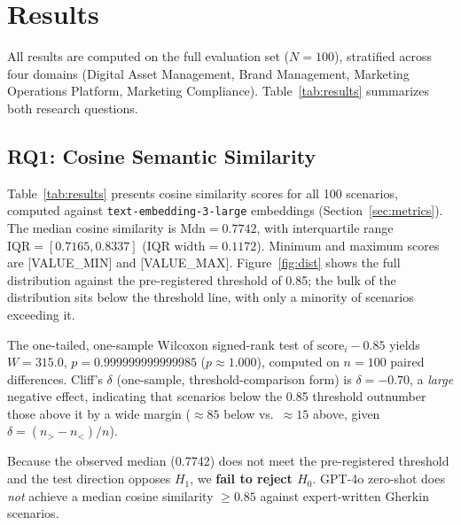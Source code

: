 \section{Results}
\label{sec:results}

All results are computed on the full evaluation set ($N{=}100$), stratified across four domains (Digital Asset Management, Brand Management, Marketing Operations Platform, Marketing Compliance).
Table~\ref{tab:results} summarizes both research questions.

\subsection{RQ1: Cosine Semantic Similarity}
\label{sec:rq1-results}

Table~\ref{tab:results} presents cosine similarity scores for all 100 scenarios, computed against \texttt{text-embedding-3-large} embeddings (Section~\ref{sec:metrics}).
The median cosine similarity is $\text{Mdn} = 0.7742$, with interquartile range $\text{IQR} = [0.7165, 0.8337]$ ($\text{IQR width} = 0.1172$).
%
%
Minimum and maximum scores are [VALUE\_MIN] and [VALUE\_MAX].
Figure~\ref{fig:dist} shows the full distribution against the pre-registered threshold of 0.85; the bulk of the distribution sits below the threshold line, with only a minority of scenarios exceeding it.

The one-tailed, one-sample Wilcoxon signed-rank test of $\text{score}_i - 0.85$ yields $W = 315.0$, $p = 0.999999999999985$ ($p \approx 1.000$), computed on $n=100$ paired differences.
Cliff's $\delta$ (one-sample, threshold-comparison form) is $\delta = -0.70$, a \emph{large} negative effect, indicating that scenarios below the 0.85 threshold outnumber those above it by a wide margin ($\approx 85$ below vs.\ $\approx 15$ above, given $\delta = (n_{>} - n_{<})/n$).

Because the observed median (0.7742) does not meet the pre-registered threshold and the test direction opposes $H_1$, we \textbf{fail to reject $H_0$}.
GPT-4o zero-shot does \emph{not} achieve a median cosine similarity $\geq 0.85$ against expert-written Gherkin scenarios.

